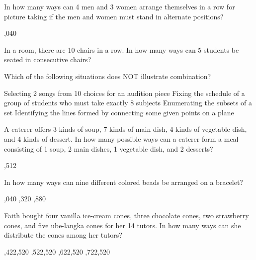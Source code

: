 \begin{questions}
\question In how many ways can  4 men and 3 women arrange themselves in a row for picture taking if the men and women must stand in alternate positions?     
\begin{multicols}{4}
\begin{choices} 
,040
\end{choices}
\end{multicols} 

\question In a room, there are 10 chairs in a row. In how many ways can 5 students be seated in consecutive chairs? 
\begin{multicols}{4}
\begin{choices}  
\end{choices}
\end{multicols} 

\question Which of the following situations does NOT illustrate combination? 
\begin{choices}  
\choice Selecting 2 songs from 10 choices for an audition piece
\choice Fixing the schedule of a group of students who must take exactly 8 subjects
\choice Enumerating the subsets of a set
\choice Identifying the lines formed by connecting some given points on a plane 
\end{choices}

\question A  caterer  offers  3  kinds  of  soup,  7  kinds  of  main  dish,  4  kinds  of vegetable  dish,  and  4  kinds  of  dessert.  In  how  many  possible  ways  can a  caterer  form  a  meal  consisting  of  1  soup,  2  main  dishes,  1  vegetable dish,  and  2  desserts?   
\begin{multicols}{4}
\begin{choices}  
,512
\end{choices}
\end{multicols} 

\question In how many ways can nine different colored beads be arranged on a bracelet?
\begin{multicols}{4}
\begin{choices}  
,040
,320
,880 
\end{choices}
\end{multicols} 

\question Faith bought four vanilla ice-cream cones, three chocolate cones, two strawberry cones, and five ube-langka cones for her 14 tutors. In how many ways can she distribute the cones among her tutors?
\begin{multicols}{4}
\begin{choices}  
,422,520
,522,520
,622,520
,722,520
\end{choices}
\end{multicols} 


\end{questions}
